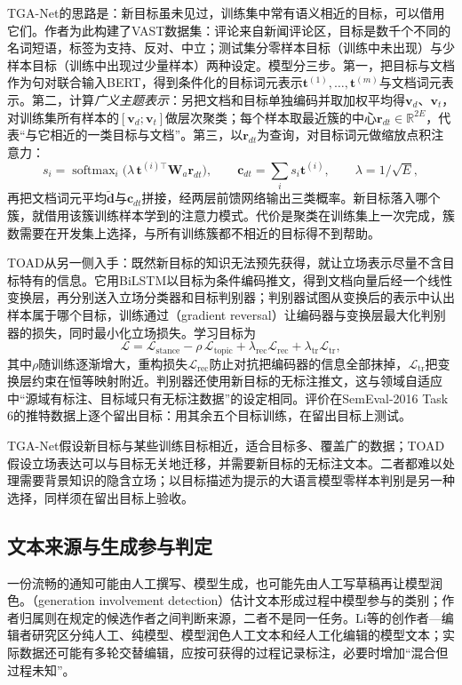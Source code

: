 TGA-Net的思路是：新目标虽未见过，训练集中常有语义相近的目标，可以借用它们。作者为此构建了VAST数据集：评论来自新闻评论区，目标是数千个不同的名词短语，标签为支持、反对、中立；测试集分零样本目标（训练中未出现）与少样本目标（训练中出现过少量样本）两种设定。模型分三步。第一，把目标与文档作为句对联合输入BERT，得到条件化的目标词元表示$\bm t^{(1)},\ldots,\bm t^{(m)}$与文档词元表示。第二，计算\emph{广义主题表示}：另把文档和目标单独编码并取加权平均得$\bm v_d$、$\bm v_t$，对训练集所有样本的$[\bm v_d;\bm v_t]$做层次聚类；每个样本取最近簇的中心$\bm r_{dt}\in\mathbb R^{2E}$，代表“与它相近的一类目标与文档”。第三，以$\bm r_{dt}$为查询，对目标词元做缩放点积注意力：
\[
  s_i=\operatorname{softmax}_i\bigl(\lambda\,\bm t^{(i)\top}\bm W_a\bm r_{dt}\bigr),\qquad
  \bm c_{dt}=\sum_i s_i\bm t^{(i)},\qquad \lambda=1/\sqrt E,
\]
再把文档词元平均$\tilde{\bm d}$与$\bm c_{dt}$拼接，经两层前馈网络输出三类概率。新目标落入哪个簇，就借用该簇训练样本学到的注意力模式。代价是聚类在训练集上一次完成，簇数需要在开发集上选择，与所有训练簇都不相近的目标得不到帮助。

TOAD从另一侧入手：既然新目标的知识无法预先获得，就让立场表示尽量不含目标特有的信息。它用BiLSTM以目标为条件编码推文，得到文档向量后经一个线性变换层，再分别送入立场分类器和目标判别器；判别器试图从变换后的表示中认出样本属于哪个目标，训练通过（gradient reversal）让编码器与变换层最大化判别器的损失，同时最小化立场损失。学习目标为
\[
  \mathcal L=\mathcal L_{\mathrm{stance}}-\rho\,\mathcal L_{\mathrm{topic}}
  +\lambda_{\mathrm{rec}}\mathcal L_{\mathrm{rec}}+\lambda_{\mathrm{tr}}\mathcal L_{\mathrm{tr}},
\]
其中$\rho$随训练逐渐增大，重构损失$\mathcal L_{\mathrm{rec}}$防止对抗把编码器的信息全部抹掉，$\mathcal L_{\mathrm{tr}}$把变换层约束在恒等映射附近。判别器还使用新目标的无标注推文，这与领域自适应中“源域有标注、目标域只有无标注数据”的设定相同。评价在SemEval-2016 Task 6的推特数据上逐个留出目标：用其余五个目标训练，在留出目标上测试。

TGA-Net假设新目标与某些训练目标相近，适合目标多、覆盖广的数据；TOAD假设立场表达可以与目标无关地迁移，并需要新目标的无标注文本。二者都难以处理需要背景知识的隐含立场；以目标描述为提示的大语言模型零样本判别是另一种选择，同样须在留出目标上验收。

\subsection{文本来源与生成参与判定}
\label{sec:nlp-classification-origin}

一份流畅的通知可能由人工撰写、模型生成，也可能先由人工写草稿再让模型润色。（generation involvement detection）估计文本形成过程中模型参与的类别；作者归属则在规定的候选作者之间判断来源，二者不是同一任务。Li等的创作者—编辑者研究区分纯人工、纯模型、模型润色人工文本和经人工化编辑的模型文本\cite{nlp-li2026creator}；实际数据还可能有多轮交替编辑，应按可获得的过程记录标注，必要时增加“混合但过程未知”。

